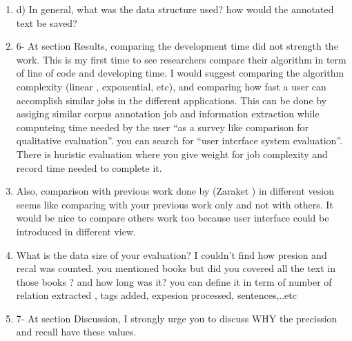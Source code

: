 \begin{enumerate}[leftmargin=0mm,label=\bfseries CommentR3.\arabic*]
\item \label{Review.3.23}
d) In general, what was the data structure used? 
how would the annotated text be saved?


\item \label{Review.3.24}
6- At section Results, comparing the development time 
did not strength the work. 
This is my first time to see researchers compare their 
algorithm in term of line of code and developing time. 
I would suggest comparing the algorithm complexity 
(linear , exponential, etc), and comparing how fast a user can 
accomplish similar jobs in the different applications. 
This can be done by assiging similar corpus annotation job 
and information extraction while computeing time needed by 
the user 
``as a survey like comparison for qualitative evaluation''. 
you can search for ``user interface system evaluation''. 
There is huristic evaluation where you give weight for job 
complexity and record time needed to complete it.


\item \label{Review.3.24}
Also, comparison with previous work done by (Zaraket ) 
in different vesion seems like comparing with your previous work 
only and not with others. 
It would be nice to compare others work too because user 
interface could be introduced in different view.

\item \label{Review.3.24}
What is the data size of your evaluation? 
I couldn't find how presion and recal was counted. 
you mentioned books but did you covered all the text in those 
books ? and how long was it? you can define it in term of 
number of relation extracted , tags added, expesion processed, 
sentences,..etc


\item \label{Review.3.24}
7- At section Discussion, I strongly urge you to discuss 
WHY the precission and recall have these values.


\end{enumerate}
